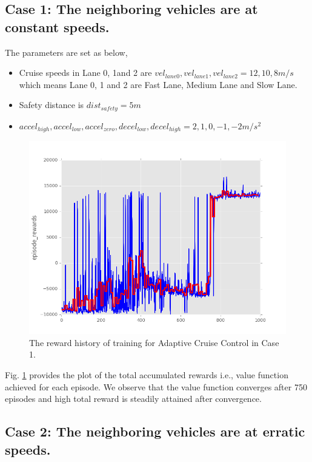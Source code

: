 \subsection{Case 1: The neighboring vehicles are at constant speeds.}

The parameters are set as below,

\begin{itemize}
\item Cruise speeds in Lane 0, 1and 2 are $vel_{lane0}, vel_{lane1}, vel_{lane2} = {12, 10, 8} m/s$ which means Lane 0, 1 and 2 are Fast Lane, Medium Lane and Slow Lane.
\item Safety distance is $dist_{safety} = 5 m$
\item $accel_{high}, accel_{low}, accel_{zero}, decel_{low}, decel_{high} = {2, 1, 0, -1, -2} m/s^2$
\end{itemize}

\begin{figure}[h]
\centering
\includegraphics[width=1.0\textwidth]{figs/ch5/agent1-reward-history-epoch-1000-a}
\caption{The reward history of training for Adaptive Cruise Control in Case 1.}
\label{fig:res-1-a}
\end{figure}

Fig. \ref{fig:res-1-a} provides the plot of the total accumulated rewards i.e., value function achieved for each episode. We observe that the value function converges after 750 episodes and high total reward is steadily attained after convergence.

\subsection{Case 2: The neighboring vehicles are at erratic speeds.}


